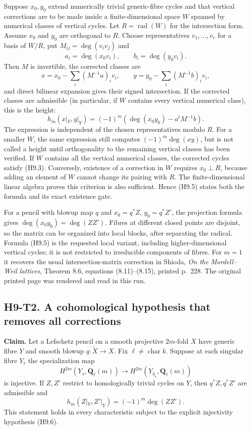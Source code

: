 \documentclass[11pt,a4paper]{article}
\begin{document}
Suppose $x_0,y_0$ extend numerically trivial generic-fibre cycles and that
vertical corrections are to be made inside a finite-dimensional space
$W$ spanned by numerical classes of vertical cycles. Let
$R=\operatorname{rad}(W)$ for the intersection form. Assume $x_0$ and $y_0$
are orthogonal to $R$. Choose representatives $v_1,\ldots,v_r$ for a basis
of $W/R$, put $M_{ij}=\deg(v_iv_j)$ and
\[
 a_i=\deg(x_0v_i),\qquad b_i=\deg(y_0v_i).
\]
Then $M$ is invertible, the corrected classes are
\[
 x=x_0-\sum_i(M^{-1}a)_i v_i,\qquad
 y=y_0-\sum_i(M^{-1}b)_i v_i,
\]
and direct bilinear expansion gives their signed intersection. If the
corrected classes are admissible (in particular, if $W$ contains every
vertical numerical class), this is the height:
\[
 h_m(x|_Y,y|_Y)=(-1)^m\left(\deg(x_0y_0)-a^{\!t}M^{-1}b\right).
                                                        \tag{H9.5}
\]
The expression is independent of the chosen representatives modulo $R$.
For a smaller $W$, the same expression still computes
$(-1)^m\deg(xy)$, but is not called a height until orthogonality to the
remaining vertical classes has been verified.
If $W$ contains all the vertical numerical classes, the corrected cycles
satisfy (H9.3). Conversely, existence of a correction in $W$ requires
$x_0\perp R$, because adding an element of $W$ cannot change its pairing
with $R$. The finite-dimensional linear algebra proves this criterion is
also sufficient. Hence (H9.5) states both the formula and its exact
existence gate.

For a pencil with blowup map $q$ and $x_0=q^*Z$, $y_0=q^*Z'$, the
projection formula gives $\deg(x_0y_0)=\deg(ZZ')$. Fibres at different
closed points are disjoint, so the matrix can be organized into local
blocks, after separating the radical. Formula (H9.5) is the requested
local variant, including higher-dimensional vertical cycles; it is not
restricted to irreducible components of fibres. For $m=1$ it recovers the
usual intersection-matrix correction in Shioda, \emph{On the Mordell--Weil
lattices}, Theorem 8.6, equations (8.11)--(8.15), printed p.~228. The
original printed page was rendered and read in this run.

\subsection*{H9-T2. A cohomological hypothesis that removes all corrections}

\textbf{Claim.} Let a Lefschetz pencil on a smooth projective $2m$-fold
$X$ have generic fibre $Y$ and smooth blowup $q:\widetilde X\to X$.
Fix $\ell\ne\operatorname{char}k$. Suppose at each singular fibre $Y_s$
the specialization map
\[
 H^{2m}(Y_s,\mathbf Q_\ell(m))\longrightarrow
 H^{2m}(Y_{\bar\eta_s},\mathbf Q_\ell(m))       \tag{H9.6}
\]
is injective. If $Z,Z'$ restrict to homologically trivial cycles on $Y$,
then $q^*Z,q^*Z'$ are admissible and
\[
 h_m(Z|_Y,Z'|_Y)=(-1)^m\deg(ZZ').               \tag{H9.7}
\]
This statement holds in every characteristic subject to the explicit
injectivity hypothesis (H9.6).
\end{document}
